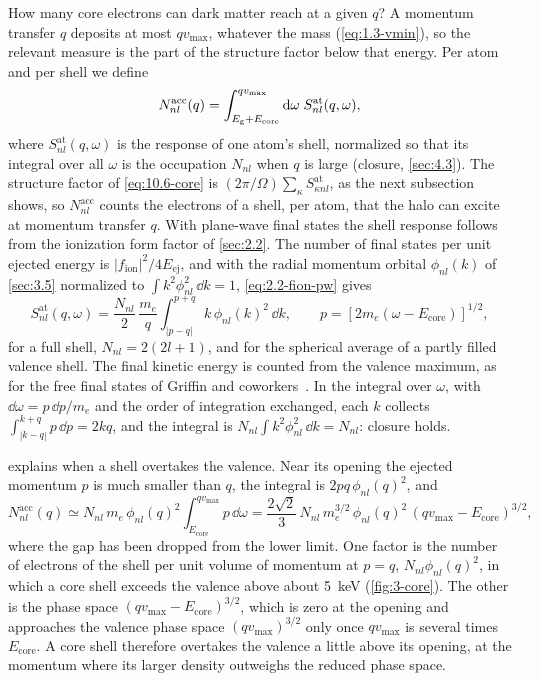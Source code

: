 How many core electrons can dark matter reach at a given $q$? A momentum transfer $q$ deposits at most $qv_{\mathrm{max}}$, whatever the mass (\cref{eq:1.3-vmin}), so the relevant measure is the part of the structure factor below that energy. Per atom and per shell we define
\begin{equation}
  N^{\mathrm{acc}}_{nl}(q) = \int_{E_{\mathrm{g}} + E_{\mathrm{core}}}^{qv_{\mathrm{max}}}\mathrm{d}\omega\;S^{\mathrm{at}}_{nl}(q,\omega) ,
  \label{eq:10.6-Nacc}
\end{equation}
where $S^{\mathrm{at}}_{nl}(q,\omega)$ is the response of one atom's shell, normalized so that its integral over all $\omega$ is the occupation $N_{nl}$ when $q$ is large (closure, \cref{sec:4.3}). The structure factor of \cref{eq:10.6-core} is $(2\pi/\Omega)\sum_\kappa S^{\mathrm{at}}_{\kappa nl}$, as the next subsection shows, so $N^{\mathrm{acc}}_{nl}$ counts the electrons of a shell, per atom, that the halo can excite at momentum transfer $q$. With plane-wave final states the shell response follows from the ionization form factor of \cref{sec:2.2}. The number of final states per unit ejected energy is $|f_{\mathrm{ion}}|^2/4E_{\mathrm{ej}}$, and with the radial momentum orbital $\phi_{nl}(k)$ of \cref{sec:3.5} normalized to $\int k^2\phi_{nl}^2\,\dd k = 1$, \cref{eq:2.2-fion-pw} gives
\begin{equation}
  S^{\mathrm{at}}_{nl}(q,\omega) = \frac{N_{nl}}{2}\,\frac{m_e}{q}\int_{|p - q|}^{p + q}k\,\phi_{nl}(k)^2\,\dd k , \qquad p = [2m_e(\omega - E_{\mathrm{core}})]^{1/2} ,
  \label{eq:10.6-Sat}
\end{equation}
for a full shell, $N_{nl} = 2(2l + 1)$, and for the spherical average of a partly filled valence shell. The final kinetic energy is counted from the valence maximum, as for the free final states of Griffin and coworkers~\cite[Eq.~(3.21)]{griffin2021extended}. In the integral over $\omega$, with $\dd\omega = p\,\dd p/m_e$ and the order of integration exchanged, each $k$ collects $\int_{|k - q|}^{k + q}p\,\dd p = 2kq$, and the integral is $N_{nl}\int k^2\phi_{nl}^2\,\dd k = N_{nl}$: closure holds.

 explains when a shell overtakes the valence. Near its opening the ejected momentum $p$ is much smaller than $q$, the integral is $2pq\,\phi_{nl}(q)^2$, and
\begin{equation*}
  N^{\mathrm{acc}}_{nl}(q) \simeq N_{nl}\,m_e\,\phi_{nl}(q)^2\int_{E_{\mathrm{core}}}^{qv_{\mathrm{max}}}p\,\dd\omega = \frac{2\sqrt2}{3}\,N_{nl}\,m_e^{3/2}\,\phi_{nl}(q)^2\,(qv_{\mathrm{max}} - E_{\mathrm{core}})^{3/2} ,
\end{equation*}
where the gap has been dropped from the lower limit. One factor is the number of electrons of the shell per unit volume of momentum at $p = q$, $N_{nl}\phi_{nl}(q)^2$, in which a core shell exceeds the valence above about \SI{5}{keV} (\cref{fig:3-core}). The other is the phase space $(qv_{\mathrm{max}} - E_{\mathrm{core}})^{3/2}$, which is zero at the opening and approaches the valence phase space $(qv_{\mathrm{max}})^{3/2}$ only once $qv_{\mathrm{max}}$ is several times $E_{\mathrm{core}}$. A core shell therefore overtakes the valence a little above its opening, at the momentum where its larger density outweighs the reduced phase space.

